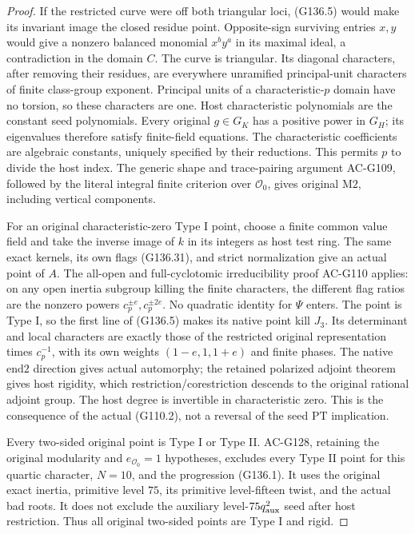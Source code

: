 \begin{proof}
If the restricted curve were off both triangular loci,
(G136.5) would make its invariant image the closed
residue point.  Opposite-sign surviving entries \(x,y\)
would give a nonzero balanced monomial \(x^b y^a\) in
its maximal ideal, a contradiction in the domain \(C\).
The curve is triangular.  Its diagonal characters,
after removing their residues, are everywhere unramified
principal-unit characters of finite class-group exponent.
Principal units of a characteristic-\(p\) domain have no
torsion, so these characters are one.  Host characteristic
polynomials are the constant seed polynomials.
Every original \(g\in G_K\) has a positive power in
\(G_H\); its eigenvalues therefore satisfy finite-field
equations.  The characteristic coefficients are algebraic
constants, uniquely specified by their reductions.
This permits \(p\) to divide the host index.
The generic shape and trace-pairing argument AC-G109,
followed by the literal integral finite criterion over
\(\mathcal O_0\), gives original \(\mathrm{M2}\), including
vertical components.

For an original characteristic-zero Type I point, choose
a finite common value field and take the inverse image
of \(k\) in its integers as host test ring.
The same exact kernels, its own flags (G136.31), and
strict normalization give an actual point of \(A\).
The all-open and full-cyclotomic irreducibility proof
AC-G110 applies: on any open inertia subgroup killing
the finite characters, the different flag ratios are
the nonzero powers \(c_p^{\pm e},c_p^{\pm2e}\).
No quadratic identity for \(\Psi\) enters.
The point is Type I, so the first line of (G136.5)
makes its native point kill \(J_3\).
Its determinant and local characters are exactly those
of the restricted original representation times
\(c_p^{-1}\), with its own weights
\((1-e,1,1+e)\) and finite phases.
The native \(\mathrm{end2}\) direction gives actual
automorphy; the retained polarized adjoint theorem
gives host rigidity, which restriction/corestriction
descends to the original rational adjoint group.
The host degree is invertible in characteristic zero.
This is the consequence of the actual (G110.2), not
a reversal of the seed \(\mathrm{PT}\) implication.

Every two-sided original point is Type I or Type II.
AC-G128, retaining the original modularity and
\(e_{\mathcal O_0}=1\) hypotheses, excludes every Type II
point for this quartic character, \(N=10\), and the
progression (G136.1).  It uses the original exact
inertia, primitive level \(75\), its primitive
level-fifteen twist, and the actual bad roots.
It does not exclude the auxiliary level-\(75q_{\rm aux}^2\)
seed after host restriction.
Thus all original two-sided points are Type I and rigid.


\end{proof}
